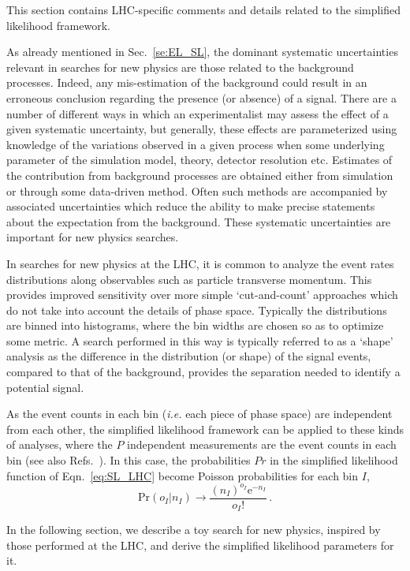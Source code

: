 \documentclass[11pt]{article}
\newcommand{\be}{\begin{equation}}
\newcommand{\ee}{\end{equation}}
\begin{document}
This section contains LHC-specific comments and details related to the simplified likelihood framework.

As already mentioned in Sec.~\ref{se:EL_SL}, the dominant systematic uncertainties relevant in searches for new physics are those related to the background processes. Indeed, any mis-estimation of the background could result in an erroneous conclusion regarding the presence (or absence) of a signal.
There are a number of different ways in which an experimentalist may assess the effect of a given systematic uncertainty, but generally, these effects are parameterized using knowledge of the variations observed in a given process when some underlying parameter of the simulation model, theory, detector resolution etc.
 Estimates of the contribution from background processes are obtained either from simulation or through some data-driven method. Often such methods are accompanied by associated  uncertainties which reduce the ability to make precise statements about the expectation from the background.
These systematic uncertainties are important for new physics searches.

In searches for new physics at the LHC, it is common to analyze the event rates distributions along observables such as particle transverse momentum.
This provides improved sensitivity over more simple `cut-and-count' approaches which do not take into account the details of phase space.
Typically the distributions are binned into histograms, where the bin widths are chosen so as to optimize some metric. A search performed in this way is typically referred to as a `shape' analysis as the difference in the distribution (or shape) of the signal events, compared to that of the background, provides the separation needed to identify a potential signal.

As the event counts in each bin (\textit{i.e.} each piece of phase space) are independent from each other, the simplified likelihood framework can be applied to these kinds of analyses, where the $P$ independent measurements are the event counts in each bin (see also Refs.~\cite{Fichet:2016gvx,SL_note}). In this case, the  probabilities $Pr$ in the simplified likelihood function of Eqn.~\ref{eq:SL_LHC} become Poisson probabilities for each bin $I$,
\be
\textrm{Pr}(o_{I}|n_{I}) \rightarrow \dfrac{(n_{I})^{o_{I}} \mathrm{e}^{-n_{I}}}{o_{I}!} \, .
\ee

In the following section, we describe a toy search for new physics, inspired by those performed at the LHC, and derive the simplified likelihood parameters for it.
\end{document}
